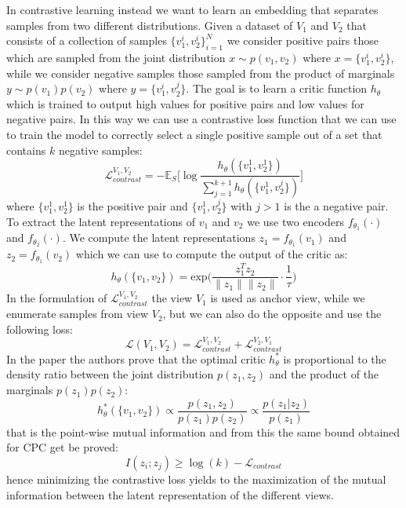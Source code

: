 In contrastive learning instead we want to learn an embedding that separates samples from two different distributions. Given a dataset of $V_1$ and $V_2$ that consists of a collection of samples $\{v_1^i, v_2^i\}_{i=1}^N$ we consider positive pairs those which are sampled from the joint distribution $x \sim p(v_1, v_2)$ where $x= \{v_1^i, v_2^i\}$, while we consider negative samples those sampled from the product of marginals $y \sim p(v_1)p(v_2)$ where $y = \{v_1^i, v_2^j\}$. The goal is to learn a critic function $h_\theta$ which is trained to output high values for positive pairs and low values for negative pairs. In this way we can use a contrastive loss function that we can use to train the model to correctly select a single positive sample out of a set that contains $k$ negative samples:
\[\mathcal{L}^{V_1, V_2}_{contrast} = -\mathbb{E}_S \Bigg[ \log \frac{h_\theta(\{v_1^1, v_2^1 \})}{\sum_{j=1}^{k+1}h_\theta(\{v_1^1, v_2^j \})}  \Bigg] \]
where $\{v_1^1, v_2^1 \}$ is the positive pair and $\{v_1^1, v_2^j \}$ with $j > 1$ is the a negative pair. To extract the latent representations of $v_1$ and $v_2$ we use two encoders $f_{\theta_1}(\cdot)$ and $f_{\theta_2}(\cdot)$. We compute the latent representations $z_1 = f_{\theta_1}(v_1)$ and $z_2 = f_{\theta_1}(v_2)$ which we can use to compute the output of the critic as:
\[ h_\theta(\{v_1, v_2\}) = \text{exp}\Bigg(\frac{z_1^Tz_2}{\lVert z_1\rVert \lVert z_2\rVert}\cdot \frac{1}{\tau}\Bigg) \]
In the formulation of $\mathcal{L}^{V_1, V_2}_{contrast}$ the view $V_1$ is used as anchor view, while we enumerate samples from view $V_2$, but we can also do the opposite and use the following loss:
\[ \mathcal{L}(V_1, V_2) = \mathcal{L}^{V_1, V_2}_{contrast} + \mathcal{L}^{V_2, V_1}_{contrast} \]
In the paper the authors prove that the optimal critic $h^*_\theta$ is proportional to the density ratio between the joint distribution $p(z_1, z_2)$ and the product of the marginals $p(z_1)p(z_2)$:
\[ h^*_\theta(\{ v_1,v_2\}) \propto \frac{p(z_1, z_2)}{p(z_1)p(z_2)} \propto \frac{p(z_1|z_2)}{p(z_1)} \]
that is the point-wise mutual information and from this the same bound obtained for CPC get be proved:
\[I(z_i;z_j) \ge \log(k) - \mathcal{L}_{contrast} \]
hence minimizing the contrastive loss yields to the maximization of the mutual information between the latent representation of the different views. 

